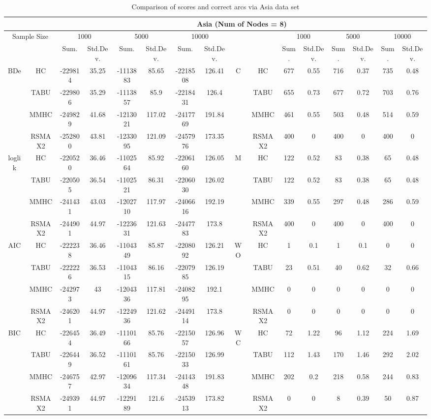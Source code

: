 \begin{table}[p]
\centering	\caption{Comparison of scores and correct arcs via Asia data set} \tiny	
{\tabcolsep=0.01in
	\begin{tabular}{cc||cc|cc|cc||cc|cc|cc|cc}
		\hline	
		& & \multicolumn{14}{c}{Asia (Num of Nodes = 8)}\tabularnewline	
		\hline	
		\multicolumn{2}{c||}{Sample Size} & \multicolumn{2}{c|}{1000} & \multicolumn{2}{c|}{5000} & \multicolumn{2}{c||}{10000} & & & \multicolumn{2}{c|}{1000} & \multicolumn{2}{c|}{5000} & \multicolumn{2}{c}{10000}\tabularnewline	
		\hline	
		& & Sum. & Std.Dev. & Sum. & Std.Dev. & Sum. & Std.Dev. & & & Sum. & Std.Dev. & Sum. & Std.Dev. & Sum. & Std.Dev.\tabularnewline
		\hline	
		\hline	
		\multirow{4}{*}{BDe} & HC & -229814 & 35.25 & -1113883 & 85.65 & -2218508 & 126.41 & \multirow{4}{*}{C} & HC & 677 & 0.55 & 716 & 0.37 & 735 & 0.48\tabularnewline	
		& TABU & -229806 & 35.29 & -1113857 & 85.9 & -2218431 & 126.4 & & TABU & 655 & 0.73 & 677 & 0.72 & 703 & 0.76\tabularnewline	
		& MMHC & -249829 & 41.68 & -1213021 & 117.02 & -2417769 & 191.84 & & MMHC & 461 & 0.55 & 503 & 0.48 & 514 & 0.59\tabularnewline	
		& RSMAX2 & -252800 & 43.81 & -1233095 & 121.09 & -2457976 & 173.35 & & RSMAX2 & 400 & 0 & 400 & 0 & 400 & 0\tabularnewline	
		\hline	
		\multirow{4}{*}{loglik} & HC & -220520 & 36.46 & -1102564 & 85.92 & -2206160 & 126.05 & \multirow{4}{*}{M} & HC & 122 & 0.52 & 83 & 0.38 & 65 & 0.48\tabularnewline	
		& TABU & -220505 & 36.54 & -1102521 & 86.31 & -2206030 & 126.02 & & TABU & 122 & 0.52 & 83 & 0.38 & 65 & 0.48\tabularnewline	
		& MMHC & -241431 & 43.03 & -1202710 & 117.97 & -2406616 & 192.19 & & MMHC & 339 & 0.55 & 297 & 0.48 & 286 & 0.59\tabularnewline	
		& RSMAX2 & -244901 & 44.97 & -1223631 & 121.63 & -2447783 & 173.8 & & RSMAX2 & 400 & 0 & 400 & 0 & 400 & 0\tabularnewline	
		\hline	
		\multirow{4}{*}{AIC} & HC & -222238 & 36.46 & -1104349 & 85.87 & -2208092 & 126.21 & \multirow{4}{*}{WO} & HC & 1 & 0.1 & 1 & 0.1 & 0 & 0\tabularnewline	
		& TABU & -222226 & 36.53 & -1104315 & 86.16 & -2207985 & 126.19 & & TABU & 23 & 0.51 & 40 & 0.62 & 32 & 0.66\tabularnewline	
		& MMHC & -242973 & 43 & -1204336 & 117.81 & -2408295 & 192.1 & & MMHC & 0 & 0 & 0 & 0 & 0 & 0\tabularnewline	
		& RSMAX2 & -246201 & 44.97 & -1224936 & 121.62 & -2449114 & 173.8 & & RSMAX2 & 0 & 0 & 0 & 0 & 0 & 0\tabularnewline	
		\hline	
		\multirow{4}{*}{BIC} & HC & -226454 & 36.49 & -1110166 & 85.76 & -2215057 & 126.96 & \multirow{4}{*}{WC} & HC & 72 & 1.22 & 96 & 1.12 & 224 & 1.69\tabularnewline	
		& TABU & -226449 & 36.52 & -1110161 & 85.76 & -2215033 & 126.99 & & TABU & 112 & 1.43 & 170 & 1.46 & 292 & 2.02\tabularnewline	
		& MMHC & -246757 & 42.97 & -1209634 & 117.34 & -2414348 & 191.83 & & MMHC & 202 & 0.2 & 218 & 0.58 & 244 & 0.83\tabularnewline	
		& RSMAX2 & -249391 & 44.97 & -1229189 & 121.6 & -2453913 & 173.82 & & RSMAX2 & 0 & 0 & 8 & 0.39 & 50 & 0.87\tabularnewline	
		\hline	
	\end{tabular}
}
\end{table} 

